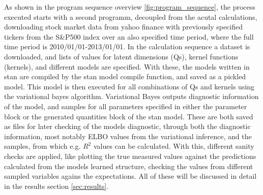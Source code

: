 As shown in the program sequence overview \ref{fig:program_sequence}, the process executed starts with a second programm, decoupled from the acutal calculations, downloading stock market data from yahoo finance \cite{yahoo_finance} with previously specified tickers from the S\&P500 index over an also specified time period, where the full time period is 2010/01/01-2013/01/01. In the calculation sequence a dataset is downloaded, and lists of values for latent dimensions (Qs), kernel functions (kernels), and different models are specified. With these, the models written in stan are compiled by the stan model compile function, and saved as a pickled model. This model is then executed for all combinations of Qs and kernels using the variational bayes algorithm. Variational Bayes outputs diagnostic information of the model, and samples for all parameters specified in either the parameter block or the generated quantities block of the stan model. These are both saved as files for later checking of the models diagnostic, through both the diagnostic information, most notably ELBO values from the variational inference, and the samples, from which e.g. $R^2$ values can be calculated. With this, different sanity checks are applied, like plotting the true measured values against the predictions calculated from the models learned structure, checking the values from different sampled variables agains the expectations. All of these will be discussed in detail in the results section \ref{sec:results}. 

